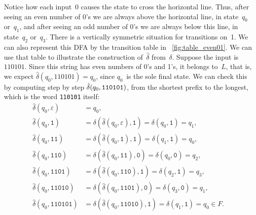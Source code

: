 Notice how each input~0 causes the state to cross the horizontal
line. Thus, after seeing an even number of 0's we are always above the
horizontal line, in state~\(q_0\) or~\(q_1\), and after seeing an odd
number of 0's we are always below this line, in state~\(q_2\)
or~\(q_3\). There is a vertically symmetric situation for transitions
on~1. We can also represent this DFA by the transition table in
\fig~\vref{fig:table_even01}. We can use that table to illustrate the
construction of~\(\hat{\delta}\) from~\(\delta\). Suppose the input is
\(110101\). Since this string has even numbers of 0's and 1's, it
belongs to~\(L\), that is, we expect \(\hat{\delta}(q_0,110101) =
q_0\), since \(q_0\)~is the sole final state. We can check this by
computing step by step \(\hat{\delta}(q_0,\verb+110101+)\), from the
shortest prefix to the longest, which is the word \verb+110101+
itself:
\begin{align*}
  \hat{\delta} (q_0, \varepsilon) 
&= q_0,\\
   \hat{\delta} (q_0, \texttt{1}) 
&= \delta (\hat{\delta} (q_0, \varepsilon), \texttt{1})
= \delta (q_0, \texttt{1})
= q_1,\\
   \hat{\delta} (q_0, \texttt{11}) 
&= \delta (\hat{\delta} (q_0, \texttt{1}), \texttt{1}) 
= \delta (q_1, \texttt{1}) 
= q_0,\\
   \hat{\delta} (q_0, \texttt{110}) 
&= \delta (\hat{\delta} (q_0, \texttt{11}), \texttt{0}) 
= \delta (q_0, \texttt{0}) 
= q_2,\\
   \hat{\delta} (q_0, \texttt{1101}) 
&= \delta (\hat{\delta} (q_0, \texttt{110}), \texttt{1}) 
= \delta (q_2, \texttt{1}) 
= q_3,\\
   \hat{\delta} (q_0, \texttt{11010}) 
&= \delta (\hat{\delta} (q_0, \texttt{1101}), \texttt{0}) 
= \delta (q_3, \texttt{0}) 
= q_1,\\
   \hat{\delta} (q_0, \texttt{110101}) 
&= \delta (\hat{\delta} (q_0, \texttt{11010}), \texttt{1}) 
= \delta (q_1, \texttt{1}) 
= q_0 \in F.
\end{align*}
